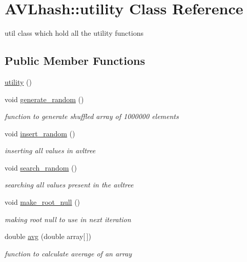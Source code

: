 \hypertarget{class_a_v_lhash_1_1utility}{\section{A\-V\-Lhash\-:\-:utility Class Reference}
\label{class_a_v_lhash_1_1utility}
}


util class which hold all the utility functions  


\subsection*{Public Member Functions}
\begin{DoxyCompactItemize}
\item 
\hyperlink{class_a_v_lhash_1_1utility_ab887dfbea4ebc6dde478d778c11bcf1c}{utility} ()
\item 
void \hyperlink{class_a_v_lhash_1_1utility_a95ab1899db5d99702b94a24696636f64}{generate\-\_\-random} ()
\begin{DoxyCompactList}\small\item\em function to generate shuffled array of 1000000 elements \end{DoxyCompactList}\item 
void \hyperlink{class_a_v_lhash_1_1utility_aefd252eb88e1f7522ec70dc4f0332327}{insert\-\_\-random} ()
\begin{DoxyCompactList}\small\item\em inserting all values in avltree \end{DoxyCompactList}\item 
void \hyperlink{class_a_v_lhash_1_1utility_afe0f9aaa2c4dc03fa4bc97da376be1a1}{search\-\_\-random} ()
\begin{DoxyCompactList}\small\item\em searching all values present in the avltree \end{DoxyCompactList}\item 
void \hyperlink{class_a_v_lhash_1_1utility_a6fe051b87690e300eb5d5d2ab0280fad}{make\-\_\-root\-\_\-null} ()
\begin{DoxyCompactList}\small\item\em making root null to use in next iteration \end{DoxyCompactList}\item 
double \hyperlink{class_a_v_lhash_1_1utility_a0c72775c9a8106cf91ae92c423c1bd50}{avg} (double array\mbox{[}$\,$\mbox{]})
\begin{DoxyCompactList}\small\item\em function to calculate average of an array \end{DoxyCompactList}\item 

\end{DoxyCompactItemize}
